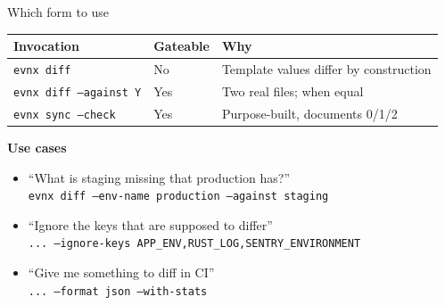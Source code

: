 \begin{frame}{Which form to use}
  \begin{tabular}{@{}lll@{}}
    \toprule
    \textbf{Invocation} & \textbf{Gateable} & \textbf{Why} \\
    \midrule
    \texttt{evnx diff} & \textcolor{evnxErr}{No} & Template values differ by construction \\
    \texttt{evnx diff --against Y} & \textcolor{evnxOk}{Yes} & Two real files; \exitzero{} when equal \\
    \texttt{evnx sync --check} & \textcolor{evnxOk}{Yes} & Purpose-built, documents 0/1/2 \\
    \bottomrule
  \end{tabular}

  \vspace{1em}
  \textbf{Use cases}
  \begin{itemize}\footnotesize
    \item ``What is staging missing that production has?''\\
          \texttt{evnx diff --env-name production --against staging}
    \item ``Ignore the keys that are supposed to differ''\\
          \texttt{... --ignore-keys APP\_ENV,RUST\_LOG,SENTRY\_ENVIRONMENT}
    \item ``Give me something to diff in CI''\\
          \texttt{... --format json --with-stats}
  \end{itemize}
\end{frame}
